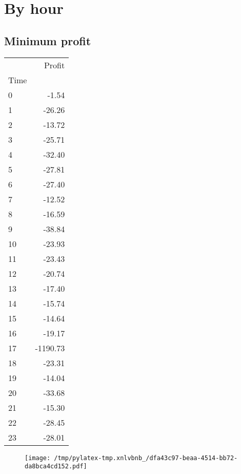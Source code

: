 \documentclass{article}%
\begin{document}
%
\newpage %
\section{By hour}%
\label{sec:Byhour}%
\subsection{Minimum profit }%
\label{subsec:Minimumprofit}%
\begin{tabular}{lr}
\toprule
{} &   Profit \\
Time &          \\
\midrule
0    &    -1.54 \\
1    &   -26.26 \\
2    &   -13.72 \\
3    &   -25.71 \\
4    &   -32.40 \\
5    &   -27.81 \\
6    &   -27.40 \\
7    &   -12.52 \\
8    &   -16.59 \\
9    &   -38.84 \\
10   &   -23.93 \\
11   &   -23.43 \\
12   &   -20.74 \\
13   &   -17.40 \\
14   &   -15.74 \\
15   &   -14.64 \\
16   &   -19.17 \\
17   & -1190.73 \\
18   &   -23.31 \\
19   &   -14.04 \\
20   &   -33.68 \\
21   &   -15.30 \\
22   &   -28.45 \\
23   &   -28.01 \\
\bottomrule
\end{tabular}
%


\begin{figure}[htbp]%
\centering%
\texttt{[image: /tmp/pylatex-tmp.xnlvbnb\_/dfa43c97-beaa-4514-bb72-da8bca4cd152.pdf]}%
\end{figure}

%
\newpage %
\end{document}
